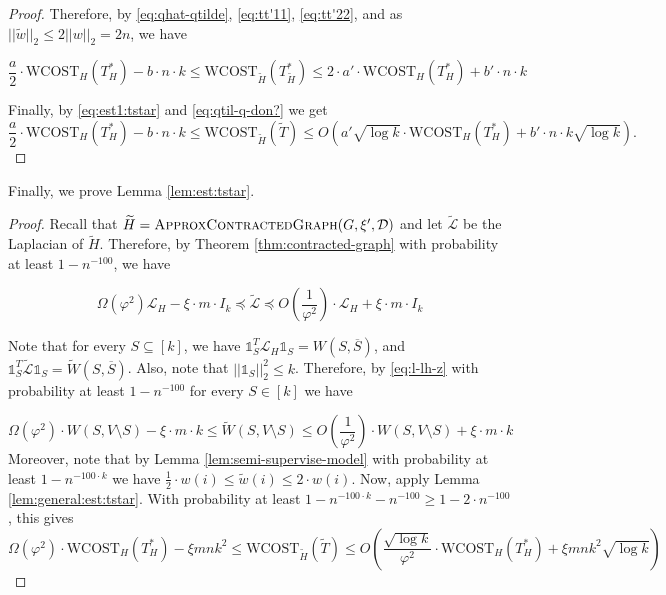 \documentclass[letterpaper,11pt]{article}
\newcommand{\wCT}{\text{WCOST}}
\newcommand{\cD}{\mathcal{D}}
\newcommand{\cL}{\mathcal{L}}
\theoremstyle{plain}
\theoremstyle{definition}
\theoremstyle{remark}
\newcommand{\wt}[1]{\widetilde{#1}}
\begin{document}
\begin{proof}
	Therefore, by \eqref{eq:qhat-qtilde}, \eqref{eq:tt'11}, \eqref{eq:tt'22}, and as 
	$||\widetilde{w}||_2\leq 2||w||_2=2n$, we have

	\begin{equation}
		\label{eq:qtil-q-don?}
		\frac{a}{2} \cdot \wCT_{H}(T^*_{H}) - b\cdot n \cdot k   \leq \wCT_{\wt{H}}(T^*_{\wt{H}}) \leq 2\cdot a' \cdot \wCT_{H}(T^*_{H}) + b'\cdot n \cdot k 
	\end{equation}

	Finally, by \eqref{eq:est1:tstar} and \eqref{eq:qtil-q-don?} we get
	\[
		\frac{a}{2} \cdot \wCT_{H}(T^*_{H}) - b\cdot n \cdot k \leq \wCT_{\wt{H}}(\widetilde{T}) \leq O\left( a' \sqrt{\log k} \cdot \wCT_{H}(T^*_{H}) + b'\cdot n\cdot k\sqrt{\log k} \right).
	\]
\end{proof}


Finally, we prove Lemma \ref{lem:est:tstar}.
\lemesttilde*

\begin{proof} 

	Recall that $\widetilde{H}=\textsc{ApproxContractedGraph}(G, \xi', \cD)$ and let $\wt{\mathcal{L}}$ 
	be  the Laplacian of $\widetilde{H}$. Therefore, by Theorem \ref{thm:contracted-graph} with 
	probability at least $1 - n^{-100}$, we have

	\begin{equation}
		\label{eq:l-lh-z}
		\Omega\left(\varphi^2\right)\cL_H - \xi\cdot m \cdot I_k \preceq \wt{\cL}  \preceq O\left(\frac{1}{\varphi^2}\right)\cdot \cL_H  + \xi\cdot m \cdot I_k
	\end{equation}

	Note that for every $S \subseteq  [k]$, we have $\mathds{1}_{S}^T \cL_H \mathds{1}_{S} = W(S,\overline{S})$, 
	and $\mathds{1}_{S}^T  \wt{\cL} \mathds{1}_{S} =  \wt{W}(S, \overline{S})$. Also, note that 
	$||\mathds{1}_{S}||_2^2\leq k$. Therefore, by \eqref{eq:l-lh-z} with probability at least 
	$1 - n^{-100}$ for every $S\in [k]$ we have

	\begin{equation}
		\label{eq:cut-prop}
		\Omega\left(\varphi^2\right)\cdot W(S, V\setminus S) -\xi \cdot m\cdot k \leq \wt{W}(S, V\setminus S) \leq O\left(\frac{1}{\varphi^2}\right) \cdot W(S, V\setminus S) + \xi \cdot m\cdot k
	\end{equation}
	Moreover, note that by Lemma \ref{lem:semi-supervise-model} with probability at 
	least $1 - n^{-100\cdot k}$ we have $\frac{1}{2}\cdot w(i)\leq\widetilde{w}(i)\leq 2\cdot w(i)$. 
	Now, apply Lemma \ref{lem:general:est:tstar}.  With probability at least 
	$1 - n^{-100\cdot k}-n^{-100}\geq 1-2\cdot n^{-100}$, this gives
	\[
		\Omega\left(\varphi^2\right)\cdot \wCT_{H}(T^*_{H}) - \xi  m n k^2 \leq \wCT_{\wt{H}}(\widetilde{T}) \leq O\left( \frac{\sqrt{\log k}}{\varphi^2}\cdot \wCT_{H}(T^*_{H}) +  \xi  m n k^2 \sqrt{\log k} \right)
	\]
\end{proof}
\end{document}
